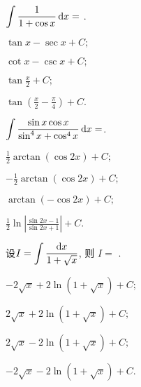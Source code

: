 \begin{problem} $\displaystyle \int \frac{1}{1 + \cos x}\mathop{}\!\mathrm{d} x =$ .

\begin{abcd} 
	
	\item $\displaystyle \tan x - \sec x + C; $

\item $\displaystyle \cot x - \csc x + C;$

\item $\displaystyle \tan\frac{x}{2} + C; $

\item $\displaystyle \tan\left( \frac{x}{2} - \frac{\pi}{4} \right) + C.$

\end{abcd}

\end{problem}           

\begin{problem} $\displaystyle \int \frac{\sin x\cos x }{\sin^4 x + \cos^4 x}\mathop{}\!\mathrm{d} x=$.

\begin{abcd} \item $\displaystyle \frac{1}{2}\arctan(\cos 2x) + C;$

\item $\displaystyle - \frac{1}{2}\arctan(\cos 2x) + C; $

\item $\displaystyle \arctan( - \cos 2x) + C;$

\item
$\displaystyle \frac{1}{2}\ln\left| \frac{\sin 2x - 1}{\sin 2x + 1} \right| + C.$

\end{abcd}

\end{problem}           \begin{problem} 设$\displaystyle I = \int \frac{{\mathop{}\!\mathrm{d} x}}{1 + \sqrt{x}}$, 则 $I =$ .

\begin{abcd} \item $\displaystyle - 2\sqrt{x} + 2\ln(1 + \sqrt{x}) + C;$

\item $\displaystyle 2\sqrt{x} + 2\ln(1 + \sqrt{x}) + C;$

\item $\displaystyle 2\sqrt{x} - 2\ln(1 + \sqrt{x}) + C;$

\item $\displaystyle - 2\sqrt{x} - 2\ln(1 + \sqrt{x}) + C.$

\end{abcd}

\end{problem}           

